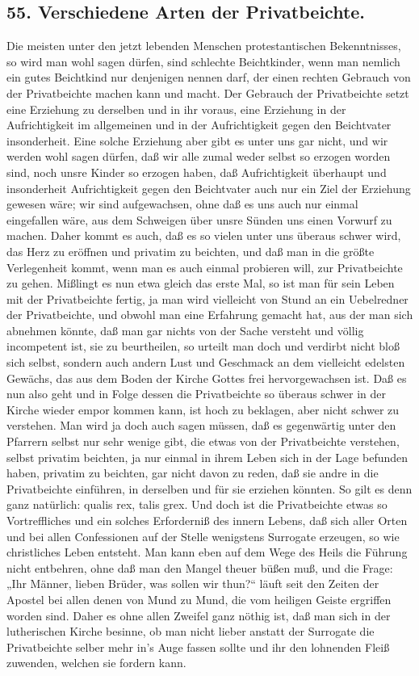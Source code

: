 \subsection*{55. Verschiedene Arten der Privatbeichte.}

Die meisten unter den jetzt lebenden Menschen protestantischen Bekenntnisses, so wird man wohl sagen dürfen, sind schlechte Beichtkinder, wenn man nemlich ein gutes Beichtkind nur denjenigen nennen darf, der einen rechten Gebrauch von der Privatbeichte machen kann und macht. Der Gebrauch der Privatbeichte setzt eine Erziehung zu derselben und in ihr voraus, eine Erziehung in der Aufrichtigkeit im
allgemeinen und in der Aufrichtigkeit gegen den Beichtvater insonderheit. Eine solche Erziehung aber gibt es unter uns gar nicht, und wir werden wohl sagen dürfen, daß wir alle zumal weder selbst so erzogen worden sind, noch unsre Kinder so erzogen haben, daß Aufrichtigkeit überhaupt und insonderheit Aufrichtigkeit gegen den Beichtvater auch nur ein Ziel der Erziehung gewesen wäre; wir sind aufgewachsen, ohne daß es uns auch nur einmal eingefallen wäre, aus dem Schweigen über unsre Sünden uns einen Vorwurf zu machen. Daher kommt es auch, daß es so vielen unter uns überaus schwer wird, das Herz zu eröffnen und privatim zu beichten, und daß man in die größte Verlegenheit kommt, wenn man es auch einmal probieren will, zur Privatbeichte zu gehen. Mißlingt es nun etwa gleich das erste Mal, so ist man für sein Leben mit der Privatbeichte fertig, ja man wird vielleicht von Stund an ein Uebelredner der Privatbeichte, und obwohl man eine Erfahrung gemacht hat, aus der man sich abnehmen könnte, daß man gar nichts von der Sache versteht und völlig incompetent ist, sie zu beurtheilen, so urteilt man doch und verdirbt nicht bloß sich selbst, sondern auch andern Lust und Geschmack an dem vielleicht edelsten Gewächs, das aus dem Boden der Kirche Gottes frei hervorgewachsen ist. Daß es nun also geht und in Folge dessen die Privatbeichte so überaus schwer in der Kirche wieder empor kommen kann, ist hoch zu beklagen, aber nicht schwer zu verstehen. Man wird ja doch auch sagen müssen, daß es gegenwärtig unter den Pfarrern selbst nur sehr wenige gibt, die etwas von der Privatbeichte verstehen, selbst privatim
beichten, ja nur einmal in ihrem Leben sich in der Lage befunden haben, privatim zu beichten, gar nicht davon zu reden, daß sie andre in die Privatbeichte einführen, in derselben und für sie erziehen könnten. So gilt es denn ganz natürlich: qualis rex, talis grex. Und doch ist die Privatbeichte etwas so Vortreffliches und ein solches Erforderniß des innern Lebens, daß sich aller Orten und bei allen Confessionen auf der Stelle wenigstens Surrogate erzeugen, so wie christliches Leben entsteht. Man kann eben auf dem Wege des Heils die Führung nicht entbehren, ohne daß man den Mangel theuer büßen muß, und die Frage: „Ihr Männer, lieben Brüder, was sollen wir thun?“ läuft seit den Zeiten der Apostel bei allen denen von Mund zu Mund, die vom heiligen Geiste ergriffen worden sind. Daher es ohne allen Zweifel ganz nöthig ist, daß man sich in der lutherischen Kirche besinne, ob man nicht lieber anstatt der Surrogate die Privatbeichte selber mehr in’s Auge fassen sollte und ihr den lohnenden Fleiß zuwenden, welchen sie fordern kann.

